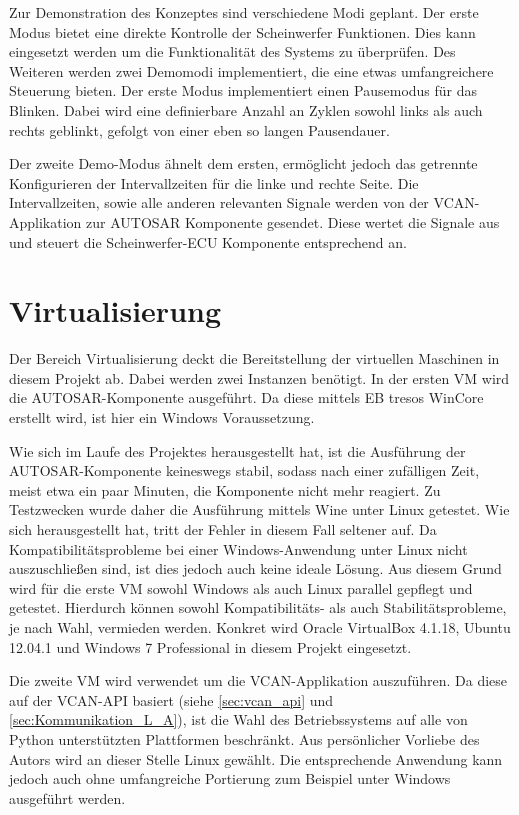 \documentclass[
  a4paper,					    %
  twoside,
  DIV=calc,     				%
  bibliography=totoc,
  cleardoublepage=empty,
  ngerman,     					%
  final       					%
]{scrbook}
\begin{document}
Zur Demonstration des Konzeptes sind verschiedene Modi geplant. Der erste Modus bietet eine direkte Kontrolle der Scheinwerfer Funktionen. Dies kann eingesetzt werden um die Funktionalität des Systems zu überprüfen. Des Weiteren werden zwei Demomodi implementiert, die eine etwas umfangreichere Steuerung bieten. Der erste Modus implementiert einen Pausemodus für das Blinken. Dabei wird eine definierbare Anzahl an Zyklen sowohl links als auch rechts geblinkt, gefolgt von einer eben so langen Pausendauer.

Der zweite Demo-Modus ähnelt dem ersten, ermöglicht jedoch das getrennte Konfigurieren der Intervallzeiten für die linke und rechte Seite. Die Intervallzeiten, sowie alle anderen relevanten Signale werden von der VCAN-Applikation zur AUTOSAR Komponente gesendet. Diese wertet die Signale aus und steuert die Scheinwerfer-ECU Komponente entsprechend an.




\section{Virtualisierung}
\label{sec:Virtualisierung_Umgesetzt}
Der Bereich Virtualisierung deckt die Bereitstellung der virtuellen Maschinen in diesem Projekt ab. Dabei werden zwei Instanzen benötigt. In der ersten VM wird die AUTOSAR-Komponente ausgeführt. Da diese mittels EB tresos WinCore erstellt wird, ist hier ein Windows Voraussetzung.

Wie sich im Laufe des Projektes herausgestellt hat, ist die Ausführung der AUTOSAR-Komponente keineswegs stabil, sodass nach einer zufälligen Zeit, meist etwa ein paar Minuten, die Komponente nicht mehr reagiert. Zu Testzwecken wurde daher die Ausführung mittels Wine unter Linux getestet. Wie sich herausgestellt hat, tritt der Fehler in diesem Fall seltener auf. Da Kompatibilitätsprobleme bei einer Windows-Anwendung unter Linux nicht auszuschließen sind, ist dies jedoch auch keine ideale Lösung. Aus diesem Grund wird für die erste VM sowohl Windows als auch Linux parallel gepflegt und getestet. Hierdurch können sowohl Kompatibilitäts- als auch Stabilitätsprobleme, je nach Wahl, vermieden werden. Konkret wird Oracle VirtualBox 4.1.18, Ubuntu 12.04.1 und Windows 7 Professional in diesem Projekt eingesetzt.

Die zweite VM wird verwendet um die VCAN-Applikation auszuführen. Da diese auf der VCAN-API basiert (siehe \ref{sec:vcan_api} und \ref{sec:Kommunikation_L_A}), ist die Wahl des Betriebssystems auf alle von Python unterstützten Plattformen beschränkt. Aus persönlicher Vorliebe des Autors wird an dieser Stelle Linux gewählt. Die entsprechende Anwendung kann jedoch auch ohne umfangreiche Portierung zum Beispiel unter Windows ausgeführt werden.
\end{document}
